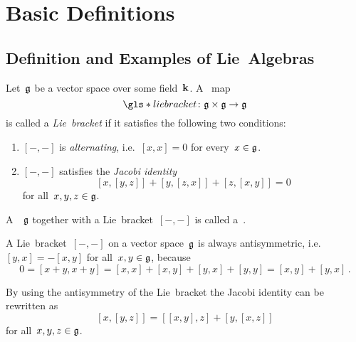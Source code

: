 \section{Basic Definitions}





\subsection{Definition and Examples of Lie~Algebras}


\begin{definition}
  Let~$\mathfrak{g}$ be a vector space over some field~$\kf$.
  A~{\bilinear{$\kf$}} map
  \[
    \gls*{lie bracket}
    \colon
    \glie \times \glie
    \to
    \glie
  \]
  is called a \emph{Lie~bracket} if it satisfies the following two conditions:
  \begin{enumerate}
    \item
    $[-, -]$ is \emph{alternating}, i.e.~$[x,x] = 0$ for every~$x \in \mathfrak{g}$.
    \item
    $[-, -]$ satisfies the \emph{Jacobi identity}
    \[
      [x,[y,z]] + [y,[z,x]] + [z,[x,y]]
      =
      0
    \]
    for all~$x,y,z \in \mathfrak{g}$.
  \end{enumerate}
  A~{\vectorspace{$\kf$}}~$\mathfrak{g}$ together with a Lie~bracket~$[-,-]$ is called a~\emph{\liealgebra{$\kf$}}.
\end{definition}


\begin{remark}
  A Lie~bracket~$[-, -]$ on a vector space~$\mathfrak{g}$ is always antisymmetric, i.e.~$[y,x] = -[x,y]$ for all~$x,y \in \mathfrak{g}$, because
  \[
    0
    =
    [x+y, x+y]
    =
    [x,x] + [x,y] + [y,x] + [y,y]
    =
    [x,y] + [y,x] \,.
  \]
\end{remark}


\begin{remark}
  By using the antisymmetry of the Lie~bracket the Jacobi identity can be rewritten as
  \[
    [x,[y,z]]
    =
    [[x,y],z] + [y,[x,z]]
  \]
  for all~$x, y, z \in \mathfrak{g}$.
\end{remark}


